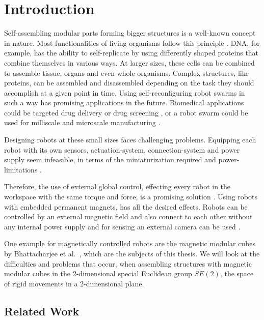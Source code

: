 \chapter{Introduction}
\label{chap:intro}

Self-assembling modular parts forming bigger structures is a well-known concept in nature.
Most functionalities of living organisms follow this principle \cite{bishop2005}.
DNA, for example, has the ability to self-replicate by using differently shaped proteins that combine themselves in various ways.
At larger sizes, these cells can be combined to assemble tissue, organs and even whole organisms.
Complex structures, like proteins, can be assembled and disassembled depending on the task they should accomplish at a given point in time. 
Using self-reconfiguring robot swarms in such a way has promising applications in the future.
Biomedical applications could be targeted drug delivery or drug screening \cite{sitti2015}, or a robot swarm could be used for milliscale and microscale manufacturing \cite{pelrine2016}.

Designing robots at these small sizes faces challenging problems.
Equipping each robot with its own sensors, actuation-system, connection-system and power supply seem infeasible, in terms of the miniaturization required and power-limitations \cite{white2007}.

Therefore, the use of external global control, effecting every robot in the workspace with the same torque and force, is a promising solution \cite{white2007}.
Using robots with embedded permanent magnets, has all the desired effects.
Robots can be controlled by an external magnetic field and also connect to each other without any internal power supply and for sensing an external camera can be used \cite{saab2019}.

One example for magnetically controlled robots are the magnetic modular cubes by Bhattacharjee et al.\ \cite{Bhattacharjee2022}, which are the subjects of this thesis.
We will look at the difficulties and problems that occur, when assembling structures with magnetic modular cubes in the 2-dimensional special Euclidean group \(SE(2)\), the space of rigid movements in a 2-dimensional plane.

\section{Related Work}

